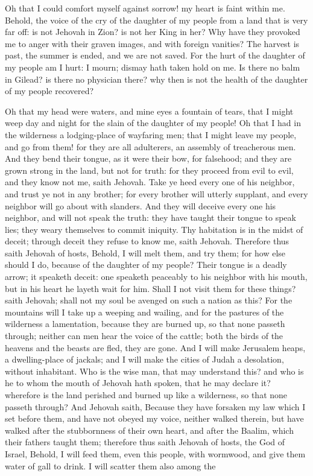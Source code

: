  Oh that I could comfort myself against sorrow! my heart is faint within me. Behold, the voice of the cry of the daughter of my people from a land that is very far off: is not Jehovah in Zion? is not her King in her? Why have they provoked me to anger with their graven images, and with foreign vanities? The harvest is past, the summer is ended, and we are not saved. For the hurt of the daughter of my people am I hurt: I mourn; dismay hath taken hold on me. Is there no balm in Gilead? is there no physician there? why then is not the health of the daughter of my people recovered? 

Oh that my head were waters, and mine eyes a fountain of tears, that I might weep day and night for the slain of the daughter of my people! Oh that I had in the wilderness a lodging-place of wayfaring men; that I might leave my people, and go from them! for they are all adulterers, an assembly of treacherous men. And they bend their tongue, as it were their bow, for falsehood; and they are grown strong in the land, but not for truth: for they proceed from evil to evil, and they know not me, saith Jehovah. Take ye heed every one of his neighbor, and trust ye not in any brother; for every brother will utterly supplant, and every neighbor will go about with slanders. And they will deceive every one his neighbor, and will not speak the truth: they have taught their tongue to speak lies; they weary themselves to commit iniquity. Thy habitation is in the midst of deceit; through deceit they refuse to know me, saith Jehovah.  Therefore thus saith Jehovah of hosts, Behold, I will melt them, and try them; for how else should I do, because of the daughter of my people? Their tongue is a deadly arrow; it speaketh deceit: one speaketh peaceably to his neighbor with his mouth, but in his heart he layeth wait for him. Shall I not visit them for these things? saith Jehovah; shall not my soul be avenged on such a nation as this?  For the mountains will I take up a weeping and wailing, and for the pastures of the wilderness a lamentation, because they are burned up, so that none passeth through; neither can men hear the voice of the cattle; both the birds of the heavens and the beasts are fled, they are gone. And I will make Jerusalem heaps, a dwelling-place of jackals; and I will make the cities of Judah a desolation, without inhabitant.  Who is the wise man, that may understand this? and who is he to whom the mouth of Jehovah hath spoken, that he may declare it? wherefore is the land perished and burned up like a wilderness, so that none passeth through? And Jehovah saith, Because they have forsaken my law which I set before them, and have not obeyed my voice, neither walked therein, but have walked after the stubbornness of their own heart, and after the Baalim, which their fathers taught them; therefore thus saith Jehovah of hosts, the God of Israel, Behold, I will feed them, even this people, with wormwood, and give them water of gall to drink. I will scatter them also among the 